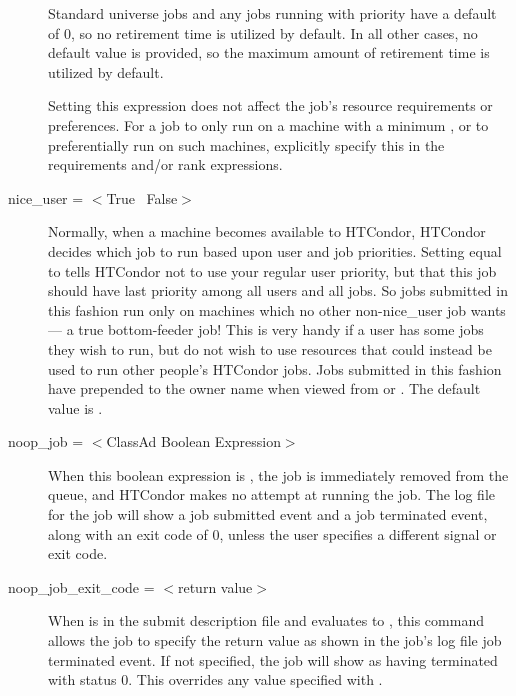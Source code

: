 \begin{description}
Standard universe jobs and any jobs running with 
priority have a default  of 0,
so no retirement time is utilized by default.
In all other cases,
no default value is provided,
so the maximum amount of retirement time is utilized by default.

Setting this expression does not affect the job's resource
requirements or preferences.  
For a job to only run on
a machine with a minimum ,
or to preferentially run on such machines, explicitly
specify this in the requirements and/or rank expressions.


\label{man-condor-submit-nice-user}
\item[nice\_user = $<$True \Bar\ False$>$] Normally, when a machine
becomes available to HTCondor, HTCondor decides which job to run based upon
user and job priorities. Setting  equal to 
tells HTCondor not to use your regular user priority, but that this job
should have last priority among all users and all jobs. So jobs
submitted in this fashion run only on machines which no other
non-nice\_user job wants --- a true bottom-feeder job! This is very
handy if a user has some jobs they wish to run, but do not wish to use
resources that could instead be used to run other people's HTCondor jobs. Jobs
submitted in this fashion have  prepended to
the owner name when viewed from  or .  The
default value is .


\label{man-condor-submit-noop-job}
\item[noop\_job = $<$ClassAd Boolean Expression$>$]
When this boolean expression is ,
the job is immediately removed from the queue,
and HTCondor makes no attempt at running the job.
The log file for the job will show a
job submitted event and a job terminated event,
along with an exit code of 0,
unless the user specifies a different signal or exit code.


\label{man-condor-submit-noop-job-exit-code}
\item[noop\_job\_exit\_code = $<$return value$>$]
When  is in the submit description file
and evaluates to ,
this command allows the job
to specify the return value as shown in the job's log file
job terminated event.
If not specified, the job will show as having terminated with status 0.
This overrides any value specified with .


\end{description}
